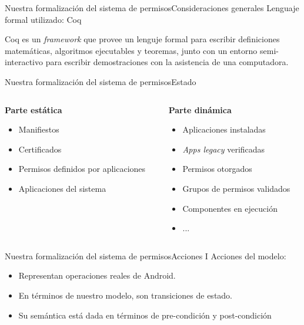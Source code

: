 \documentclass[pdf, handout]{beamer} %
\begin{document}
\begin{frame}{Nuestra formalización del sistema de permisos}{Consideraciones generales}
    Lenguaje formal utilizado: Coq
    \vspace{10px}
    \begin{block}{}
        Coq es un \textit{framework} que provee un lenguje formal para escribir definiciones
        matemáticas, algoritmos ejecutables y teoremas, junto con un entorno semi-interactivo para
        escribir demostraciones con la asistencia de una computadora.
    \end{block}
\end{frame}

\begin{frame}{Nuestra formalización del sistema de permisos}{Estado}
    \begin{columns}[T]
        \begin{column}{.45\textwidth}
            \textbf{Parte estática}
            \begin{itemize}
                \item Manifiestos
                \item Certificados
                \item Permisos definidos por aplicaciones
                \item Aplicaciones del sistema
            \end{itemize}
        \end{column}
        \pause
        \begin{column}{.55\textwidth}
            \textbf{Parte dinámica}
            \begin{itemize}
                \item Aplicaciones instaladas
                \item \textit{Apps legacy} verificadas
                \item Permisos otorgados
                \item Grupos de permisos validados
                \item Componentes en ejecución
                \item ...
            \end{itemize}
        \end{column}
    \end{columns}
\end{frame}

\begin{frame}{Nuestra formalización del sistema de permisos}{Acciones I}
    Acciones del modelo:
    \begin{itemize}[<+->]
        \item Representan operaciones reales de Android.
        \item En términos de nuestro modelo, son transiciones de estado.
        \item Su semántica está dada en términos de pre-condición y post-condición
    \end{itemize}
\end{frame}
\end{document}
